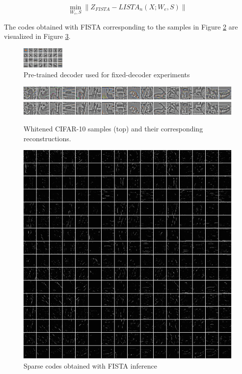 \begin{equation} 
\nonumber 
\min_{W_e,S} \|Z_{FISTA} - LISTA_n(X;W_e,S) \|
\end{equation} 

The codes obtained with FISTA corresponding to the samples in Figure \ref{fig:CIFAR_rec}
are visualized in Figure \ref{fig:activations}. 

\begin{figure} \centering
\includegraphics[scale=2]{./figures/LISTA/FISTA_decoder.png}
\caption{Pre-trained decoder used for fixed-decoder experiments}
\label{fig:FISTA_decoder} \end{figure}  

\begin{figure} 
\centering
\includegraphics[scale=0.75]{./figures/LISTA/sample.png}
\includegraphics[scale=0.75]{./figures/LISTA/rec.png}
\caption{Whitened CIFAR-10 samples (top) and their corresponding reconstructions.}
\label{fig:CIFAR_rec} \end{figure}  

\begin{figure} \centering
\includegraphics[scale=0.75]{./figures/LISTA/activations.png}
\caption{Sparse codes obtained with FISTA inference}
\label{fig:activations} \end{figure}  

